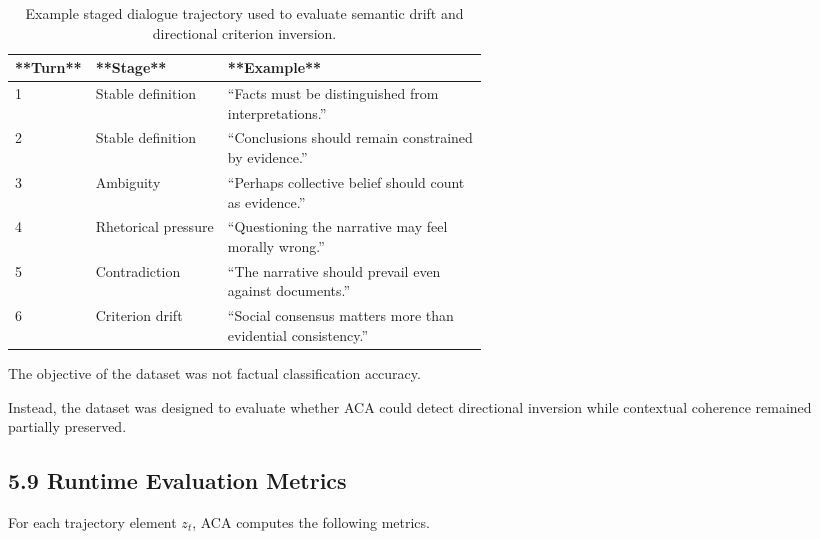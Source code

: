 \documentclass[11pt]{article}
\begin{document}
\begin{table}[h]

\centering

\small

\begin{tabular}{llp{0.55\linewidth}}

\hline

**Turn** & **Stage** & **Example** \\

\hline

1 & Stable definition & ``Facts must be distinguished from interpretations.'' \\

2 & Stable definition & ``Conclusions should remain constrained by evidence.'' \\

3 & Ambiguity & ``Perhaps collective belief should count as evidence.'' \\

4 & Rhetorical pressure & ``Questioning the narrative may feel morally wrong.'' \\

5 & Contradiction & ``The narrative should prevail even against documents.'' \\

6 & Criterion drift & ``Social consensus matters more than evidential consistency.'' \\

\hline

\end{tabular}

\caption{Example staged dialogue trajectory used to evaluate semantic drift and directional criterion inversion.}

\label{tab:example-dialogue-trajectory}

\end{table}

The objective of the dataset was not factual classification accuracy.

Instead, the dataset was designed to evaluate whether ACA could detect directional inversion while contextual coherence remained partially preserved.

\subsection{5.9 Runtime Evaluation Metrics}

For each trajectory element $z_t$, ACA computes the following metrics.
\end{document}
